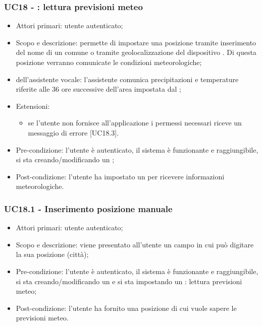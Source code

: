 \subsubsection{UC18 - : lettura previsioni meteo}
\begin{itemize}
	\item  Attori primari: utente autenticato;
	\item  Scopo e descrizione: permette di impostare una posizione tramite inserimento del nome di un comune o tramite geolocalizzazione del dispositivo . Di questa posizione verranno comunicate le condizioni meteorologiche;
	\item  {} dell'assistente vocale: l'assistente comunica precipitazioni e temperature riferite alle 36 ore successive dell'area impostata dal ;
	\item  Estensioni: 
		   \begin{itemize}
				\item se l'utente non fornisce all'applicazione i permessi necessari riceve un messaggio di errore [UC18.3].
		   \end{itemize}
	\item  Pre-condizione: l'utente è autenticato, il sistema è funzionante e raggiungibile, si sta creando/modificando un ;
	\item  Post-condizione: l'utente ha impostato un  per ricevere informazioni meteorologiche.
\end{itemize}
\subsubsection{UC18.1 - Inserimento posizione manuale}
\begin{itemize}
	\item  Attori primari: utente autenticato;
	\item  Scopo e descrizione: viene presentato all'utente un campo in cui può digitare la sua posizione (città);
	\item  Pre-condizione: l'utente è autenticato, il sistema è funzionante e raggiungibile, si sta creando/modificando un  e si sta impostando un : lettura previsioni meteo;
	\item  Post-condizione: l'utente ha fornito una posizione di cui vuole sapere le previsioni meteo.
\end{itemize}
